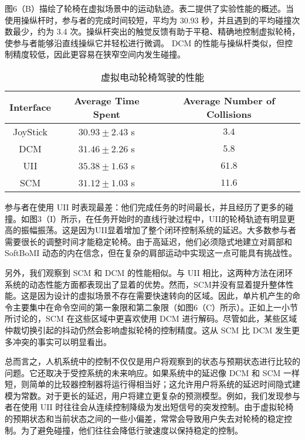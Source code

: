 图6（B）描绘了轮椅在虚拟场景中的运动轨迹。表二提供了实验性能的概述。当使用操纵杆时，参与者的完成时间较短，平均为 30.93 秒，并且遇到的平均碰撞次数最少，约为 3.4 次。操纵杆突出的触觉反馈有助于平稳、精确地控制虚拟轮椅，使参与者能够沿直线操纵它并轻松进行微调。 DCM 的性能与操纵杆类似，但控制精度较低，因此更容易在狭窄空间内发生碰撞。  

\begin{table}
 \centering
 \caption{虚拟电动轮椅驾驶的性能  }
 \setlength{\tabcolsep}{5pt}
 \begin{tabular}{c c c}
 \hline\hline
  Interface & Average Time Spent & Average Number of Collisions  \\  
 \hline
 JoyStick&        $30.93\pm 2.43$        s&        $3.4$         \\ 
 DCM&        $31.46\pm 2.26$        s&        $5.8$         \\ 
 UII&        $35.38\pm 1.63$        s&        $61.8$         \\ 
 SCM&        $31.12\pm 1.03$        s&        $11.6$         \\  
 \hline\hline
 \end{tabular}
 \label{tab3-2}
\end{table}     

参与者在使用 UII 时表现最差：他们完成任务的时间最长，并且经历了更多的碰撞。如图3（I）所示，在任务开始时的直线行驶过程中，UII的轮椅轨迹有明显更高的振幅振荡。这是因为UII显着增加了整个闭环控制系统的延迟。大多数参与者需要很长的调整时间才能稳定轮椅。由于高延迟，他们必须隐式地建立对肩部和 SoftBoMI 动态的内在信念，但在复杂的肩部运动中实现这一点可能具有挑战性。  

另外，我们观察到 SCM 和 DCM 的性能相似。与 UII 相比，这两种方法在闭环系统的动态性能方面都表现出了显着的优势。然而，SCM并没有显着提升整体性能。这是因为设计的虚拟场景不存在需要快速转向的区域。因此，单片机产生的命令主要集中在命令空间的第一象限和第二象限（如图6（C）所示）。正如上一小节所讨论的，SCM 在这些区域中更喜欢使用 DCM 进行解码。尽管如此，某些区域仲裁切换引起的抖动仍然会影响虚拟轮椅的控制精度。这从 SCM 比 DCM 发生更多冲突的事实可以明显看出。  

总而言之，人机系统中的控制不仅仅是用户将观察到的状态与预期状态进行比较的问题。它还取决于受控系统的未来响应。如果系统中的延迟像 DCM 和 SCM 一样短，则简单的比较器控制器将运行得相当好；这允许用户将系统的延迟时间隐式建模为常数。对于更长的延迟，用户将建立更复杂的预测模型。例如，我们发现参与者在使用 UII 时往往会从连续控制降级为发出短信号的突发控制。由于虚拟轮椅的预期状态和当前状态之间的一些小偏差，常常会导致用户失去对轮椅的稳定控制。为了避免碰撞，他们往往会降低行驶速度以保持稳定的控制。  

